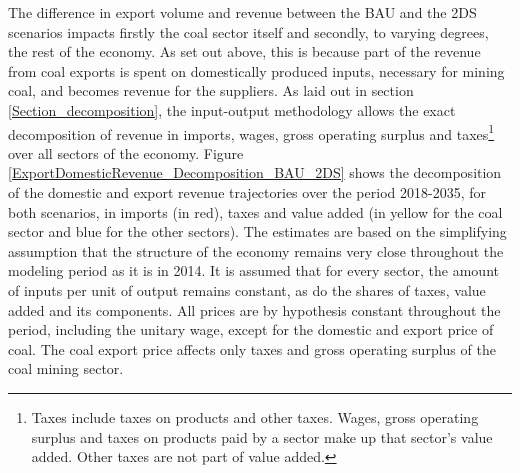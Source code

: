 \documentclass[12pt,english]{article}
\begin{document}
The difference in export volume and revenue between the BAU and the 2DS scenarios impacts firstly the coal sector itself and secondly, to varying degrees, the rest of the economy. As set out above, this is because part of the revenue from coal exports is spent on domestically produced inputs, necessary for mining coal, and becomes revenue for the suppliers. %
As laid out in section \ref{Section_decomposition}, the input-output methodology allows the exact decomposition of revenue in imports, wages, gross operating surplus and taxes\footnote{Taxes include taxes on products and other taxes. Wages, gross operating surplus and taxes on products paid by a sector make up that sector's value added. Other taxes are not part of value added.} over all sectors of the economy. Figure \ref{ExportDomesticRevenue_Decomposition_BAU_2DS} shows the decomposition of the domestic and export revenue trajectories over the period 2018-2035, for both scenarios, in imports (in red), taxes and value added (in yellow for the coal sector and blue for the other sectors). The estimates are based on the simplifying assumption that the structure of the economy remains very close throughout the modeling period as it is in 2014. It is assumed that for every sector, the amount of inputs per unit of output remains constant, as do the shares of taxes, value added and its components. All prices are by hypothesis constant throughout the period, including the unitary wage, except for the domestic and export price of coal. The coal export price affects only taxes and gross operating surplus of the coal mining sector. %
\end{document}
